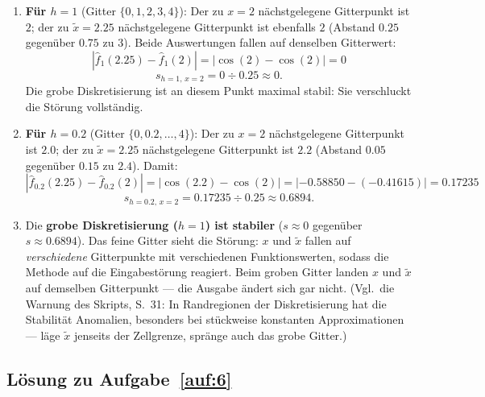 \documentclass[a4paper,11pt]{scrartcl}
\begin{document}
\begin{enumerate}[label=(\alph*)]
  \item \textbf{Für $h = 1$} (Gitter $\{0, 1, 2, 3, 4\}$): Der zu $x = 2$ nächstgelegene Gitterpunkt ist $2$; der zu $\tilde{x} = 2.25$ nächstgelegene Gitterpunkt ist ebenfalls $2$ (Abstand $0.25$ gegenüber $0.75$ zu $3$). Beide Auswertungen fallen auf denselben Gitterwert:
  \[ \left| \hat{f}_1(2.25) - \hat{f}_1(2) \right| = \left| \cos(2) - \cos(2) \right| = 0 \]
  \[ s_{h=1,\,x=2} = 0 \div 0.25 \approx 0. \]
  Die grobe Diskretisierung ist an diesem Punkt maximal stabil: Sie \glqq verschluckt\grqq{} die Störung vollständig.
  \item \textbf{Für $h = 0.2$} (Gitter $\{0, 0.2, \ldots, 4\}$): Der zu $x = 2$ nächstgelegene Gitterpunkt ist $2.0$; der zu $\tilde{x} = 2.25$ nächstgelegene Gitterpunkt ist $2.2$ (Abstand $0.05$ gegenüber $0.15$ zu $2.4$). Damit:
  \[ \left| \hat{f}_{0.2}(2.25) - \hat{f}_{0.2}(2) \right| = \left| \cos(2.2) - \cos(2) \right| = |-0.58850 - (-0.41615)| = 0.17235 \]
  \[ s_{h=0.2,\,x=2} = 0.17235 \div 0.25 \approx 0.6894. \]
  \item Die \textbf{grobe Diskretisierung ($h = 1$) ist stabiler} ($s \approx 0$ gegenüber $s \approx 0.6894$). Das feine Gitter \glqq sieht\grqq{} die Störung: $x$ und $\tilde{x}$ fallen auf \emph{verschiedene} Gitterpunkte mit verschiedenen Funktionswerten, sodass die Methode auf die Eingabestörung reagiert. Beim groben Gitter landen $x$ und $\tilde{x}$ auf demselben Gitterpunkt --- die Ausgabe ändert sich gar nicht. (Vgl.\ die Warnung des Skripts, S.~31: In Randregionen der Diskretisierung hat die Stabilität Anomalien, besonders bei stückweise konstanten Approximationen --- läge $\tilde{x}$ jenseits der Zellgrenze, spränge auch das grobe Gitter.)
\end{enumerate}

\subsection*{Lösung zu Aufgabe~\ref{auf:6}}
\end{document}
